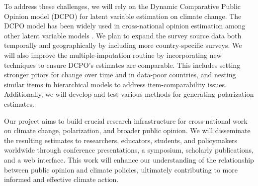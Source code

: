 \documentclass[11pt]{article}
\begin{document}

To address these challenges, we will rely on the Dynamic Comparative Public Opinion model (DCPO) \citep{solt2020modeling} for latent variable estimation on climate change. The DCPO model has been widely used in cross-national opinion estimation \citep{woo2023public,humacrointerest,woo2023measuring} among other latent variable models \citep[e.g.,][]{claassen2019estimating, caughey2019policy, mcgann2019parallel, kolczynska2024modeling}. We plan to expand the survey source data both temporally and geographically by including more country-specific surveys. We will also improve the multiple-imputation routine by incorporating new techniques to ensure DCPO's estimates are comparable. This includes setting stronger priors for change over time and in data-poor countries, and nesting similar items in hierarchical models to address item-comparability issues. Additionally, we will develop and test various methods for generating polarization estimates.




Our project aims to build crucial research infrastructure for cross-national work on climate change, polarization, and broader public opinion. We will disseminate the resulting estimates to researchers, educators, students, and policymakers worldwide through conference presentations, a symposium, scholarly publications, and a web interface. This work will enhance our understanding of the relationship between public opinion and climate policies, ultimately contributing to more informed and effective climate action.

\printbibliography
\end{document}
